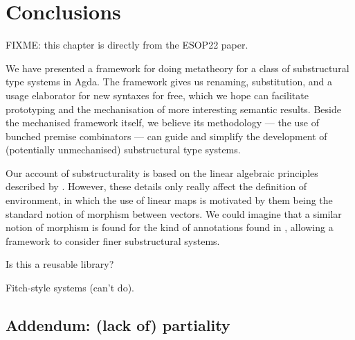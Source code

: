 \chapter{Conclusions}\label{sec:conc}

FIXME: this chapter is directly from the ESOP22 paper.

We have presented a framework for doing metatheory for a class of substructural
type systems in Agda.
The framework gives us renaming, substitution, and a usage elaborator for new
syntaxes for free, which we hope can facilitate prototyping and the
mechanisation of more interesting semantic results.
Beside the mechanised framework itself, we believe its methodology --- the use
of bunched premise combinators --- can guide and simplify the development of
(potentially unmechanised) substructural type systems.

Our account of substructurality is based on the linear algebraic
principles described by \citet{WA21}.
However, these details only really affect the definition of environment,
in which the use of linear maps is motivated by them being the standard notion
of morphism between vectors.
We could imagine that a similar notion of morphism is found for the kind of
annotations found in \citet{LicataSR17}, allowing a framework to consider
finer substructural systems.

Is this a reusable library?

Fitch-style systems (can't do).

\section{Addendum: (lack of) partiality}\label{sec:part}

